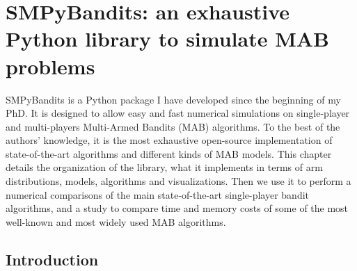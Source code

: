 
\chapter{SMPyBandits: an exhaustive Python library to simulate MAB problems}
\label{chapter:3}

\graphicspath{{2-Chapters/3-Chapter/Images/}{2-Chapters/3-Chapter/logs/}{2-Chapters/3-Chapter/SMPyBandits_paper.git/plots/}}


\abstractStartChapter{}%
%
SMPyBandits is a Python package I have developed since the beginning of my PhD.
It is designed to allow easy and fast numerical simulations on single-player and multi-players Multi-Armed Bandits (MAB) algorithms.
To the best of the authors' knowledge, it is the most exhaustive open-source implementation of state-of-the-art algorithms and different kinds of MAB models.
%
This chapter details the organization of the library, what it implements in terms of arm distributions, models, algorithms and visualizations.
Then we use it to perform a numerical comparisons of the main state-of-the-art single-player bandit algorithms, and a study to compare time and memory costs of some of the most well-known and most widely used MAB algorithms.

\minitocStartChapter{}

\section{Introduction}
\label{sec:3:Introduction}



